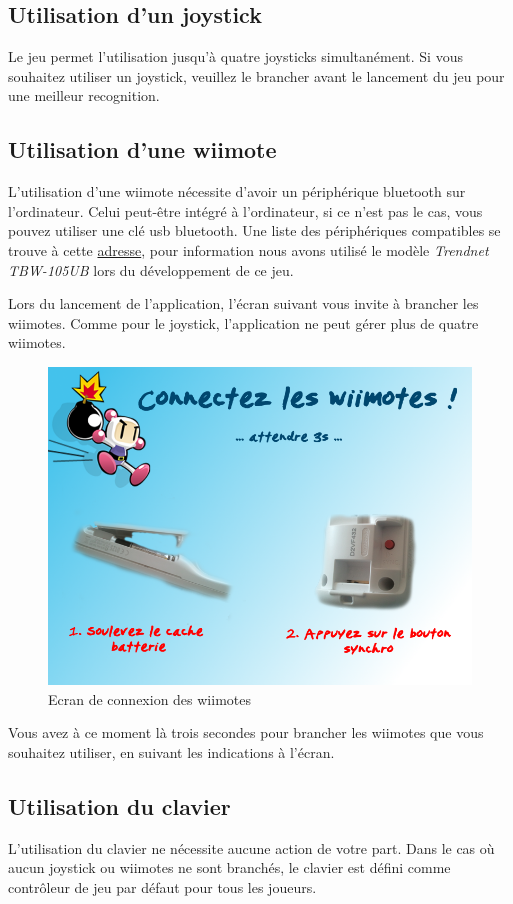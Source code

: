 \subsection{Utilisation d'un joystick}
	Le jeu permet l'utilisation jusqu'à quatre joysticks simultanément. Si vous souhaitez utiliser un joystick, veuillez le brancher avant le lancement du jeu pour une meilleur recognition.
	
\subsection{Utilisation d'une wiimote}

	L'utilisation d'une wiimote nécessite d'avoir un périphérique bluetooth sur l'ordinateur. Celui peut-être intégré à l'ordinateur, si ce n'est pas le cas, vous pouvez utiliser une clé usb bluetooth. Une liste des périphériques compatibles se trouve à cette \href{http://wiibrew.org/wiki/List_of_Working_Bluetooth_Devices}{adresse}, pour information nous avons utilisé le modèle \textit{Trendnet TBW-105UB} lors du développement de ce jeu.
	
	
	Lors du lancement de l'application, l'écran suivant vous invite à brancher les wiimotes. Comme pour le joystick, l'application ne peut gérer plus de quatre wiimotes.
	
\begin{figure}[h]
	\begin{center}
		\includegraphics[scale=0.5]{images/wiiScreen.png}
		\caption{Ecran de connexion des wiimotes}
	\end{center}
\end{figure}

		
	Vous avez à ce moment là trois secondes pour brancher les wiimotes que vous souhaitez utiliser, en suivant les indications à l'écran.
	

\subsection{Utilisation du clavier}

L'utilisation du clavier ne nécessite aucune action de votre part. Dans le cas où aucun joystick ou wiimotes ne sont branchés, le clavier est défini comme contrôleur de jeu par défaut pour tous les joueurs.
